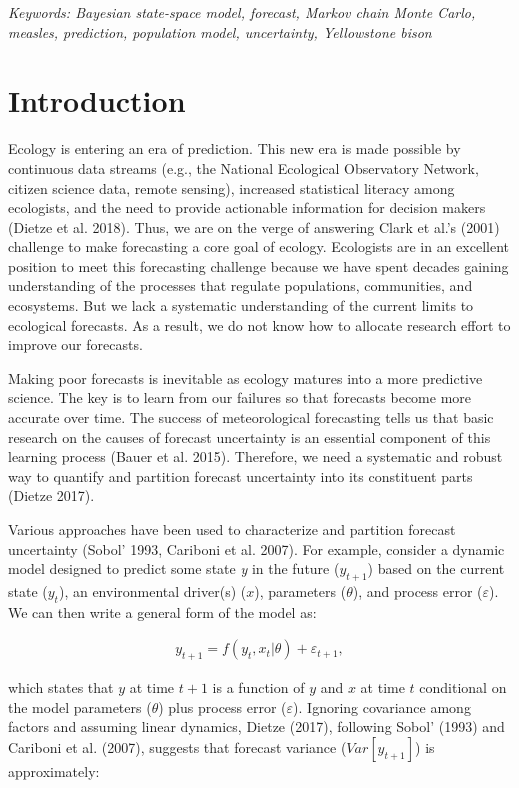 \documentclass[12pt,]{article}
\begin{document}
\emph{Keywords: Bayesian state-space model, forecast, Markov chain Monte
Carlo, measles, prediction, population model, uncertainty, Yellowstone
bison}

\hypertarget{introduction}{%
\section{Introduction}\label{introduction}}

Ecology is entering an era of prediction. This new era is made possible
by continuous data streams (e.g., the National Ecological Observatory
Network, citizen science data, remote sensing), increased statistical
literacy among ecologists, and the need to provide actionable
information for decision makers (Dietze et al. 2018). Thus, we are on
the verge of answering Clark et al.'s (2001) challenge to make
forecasting a core goal of ecology. Ecologists are in an excellent
position to meet this forecasting challenge because we have spent
decades gaining understanding of the processes that regulate
populations, communities, and ecosystems. But we lack a systematic
understanding of the current limits to ecological forecasts. As a
result, we do not know how to allocate research effort to improve our
forecasts.

Making poor forecasts is inevitable as ecology matures into a more
predictive science. The key is to learn from our failures so that
forecasts become more accurate over time. The success of meteorological
forecasting tells us that basic research on the causes of forecast
uncertainty is an essential component of this learning process (Bauer et
al. 2015). Therefore, we need a systematic and robust way to quantify
and partition forecast uncertainty into its constituent parts (Dietze
2017).

Various approaches have been used to characterize and partition forecast
uncertainty (Sobol' 1993, Cariboni et al. 2007). For example, consider a
dynamic model designed to predict some state \emph{y} in the future
(\(y_{t+1}\)) based on the current state (\(y_{t}\)), an environmental
driver(s) (\(x\)), parameters (\(\theta\)), and process error
(\(\varepsilon\)). We can then write a general form of the model as:

\begin{align}
y_{t+1} = f(y_t, x_t|\theta) + \varepsilon_{t+1},
\end{align}

\noindent{}which states that \(y\) at time \(t+1\) is a function of
\(y\) and \(x\) at time \(t\) conditional on the model parameters
(\(\theta\)) plus process error (\(\varepsilon\)). Ignoring covariance
among factors and assuming linear dynamics, Dietze (2017), following
Sobol' (1993) and Cariboni et al. (2007), suggests that forecast
variance (\(Var[y_{t+1}]\)) is approximately:
\end{document}

